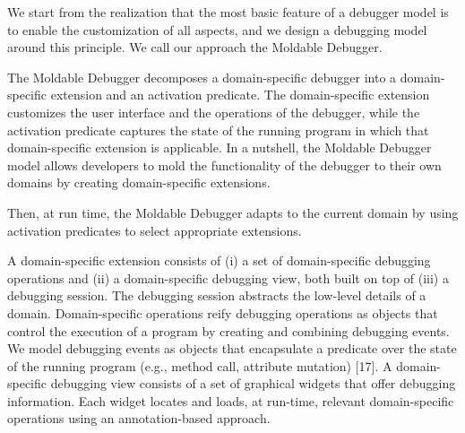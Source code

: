 We start from the realization that the most basic feature of a debugger model is to enable the customization of all aspects, and we design a debugging model around this principle. We call our approach the Moldable Debugger.

The Moldable Debugger decomposes a domain-specific debugger into a domain- specific extension and an activation predicate. The domain-specific extension customizes the user interface and the operations of the debugger, while the activation predicate captures the state of the running program in which that domain-specific extension is applicable. In a nutshell, the Moldable Debugger model allows developers to mold the functionality of the debugger to their own domains by creating domain-specific extensions. 

Then, at run time, the Moldable Debugger adapts to the current domain by using activation predicates to select appropriate extensions.

A domain-specific extension consists of (i) a set of domain-specific debugging operations and (ii) a domain-specific debugging view, both built on top of (iii) a debugging session. The debugging session abstracts the low-level details of a domain. Domain-specific operations reify debugging operations as objects that control the execution of a program by creating and combining debugging events. We model debugging events as objects that encapsulate a predicate over the state of the running program (e.g., method call, attribute mutation) [17]. A domain- specific debugging view consists of a set of graphical widgets that offer debugging information. Each widget locates and loads, at run-time, relevant domain-specific operations using an annotation-based approach.

